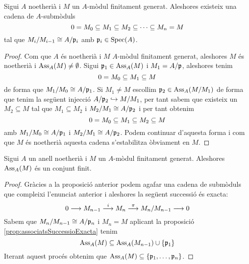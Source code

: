 \documentclass[../../../main.tex]{subfiles}
\begin{document}
\begin{prop}
\label{prop:noetheriaCadenaSubmoduls} Sigui $A$ noetherià i $M$ un $A$-mòdul finitament generat. Aleshores existeix una cadena de $A$-submòduls
\begin{equation}
    \notag
    0 = M_0\subseteq M_1\subseteq M_2\subseteq \cdots\subseteq M_n = M
\end{equation}
tal que $M_i/M_{i-1}\cong A/\mathfrak{p}_i$ amb $\mathfrak{p}_i\in\mathrm{Spec}(A)$.
\end{prop}
\begin{proof}
Com que $A$ és noetherià i $M$ $A$-mòdul finitament generat, aleshores $M$ és noetherià i $\operatorname{Ass}_A(M)\neq\emptyset$. Sigui $\mathfrak{p}_1\in\operatorname{Ass}_A(M)$ i $M_1 = A/\mathfrak{p}$, aleshores tenim
\begin{equation}
    \notag
    0 = M_0\subseteq M_1\subseteq M
\end{equation}
de forma que $M_1/M_0\cong A/\mathfrak{p}_1$. Si $M_1\neq M$ escollim $\mathfrak{p}_2\in \operatorname{Ass}_A(M/M_1)$ de forma que tenim la següent injecció $A/\mathfrak{p}_2\hookrightarrow M/M_1$, per tant sabem que existeix un $M_2\subseteq M$ tal que $M_1\subseteq M_2$ i $M_2/M_1\cong A/\mathfrak{p}_2$ i per tant obtenim 
\begin{equation}
    \notag
    0 = M_0\subseteq M_1\subseteq M_2\subseteq M
\end{equation}
amb $M_1/M_0\cong A/\mathfrak{p}_1$ i $M_2/M_1\cong A/\mathfrak{p}_2$. Podem continuar d'aquesta forma i com que $M$ és noetherià aquesta cadena s'estabilitza òbviament en $M$.
\end{proof}


\begin{coro}
\label{coro:associatsConjuntFinit} Sigui $A$ un anell noetherià i $M$ un $A$-mòdul finitament generat. Aleshores $\operatorname{Ass}_A(M)$ és un conjunt finit.
\end{coro}
\begin{proof}
Gràcies a la proposició anterior podem agafar una cadena de submòduls que compleixi l'enunciat anterior i aleshores la següent successió és exacta:
\begin{equation}
    \notag
    0\longrightarrow M_{n-1}\overset{i}{\longrightarrow}M_n\overset{\pi}{\longrightarrow}M_n/M_{n-1}\longrightarrow 0
\end{equation}
Sabem que $M_n/M_{n-1}\cong A/\mathfrak{p}_n$ i $M_n = M$ aplicant la proposició \ref{prop:associatsSuccessioExacta} tenim
\begin{equation}
    \notag
    \operatorname{Ass}_A(M)\subseteq \operatorname{Ass}_A(M_{n-1})\cup\{\mathfrak{p}_1\}
\end{equation}
Iterant aquest procés obtenim que $\operatorname{Ass}_A(M)\subseteq \{\mathfrak{p}_1,\ldots,\mathfrak{p}_n\}$.
\end{proof}
\end{document}
